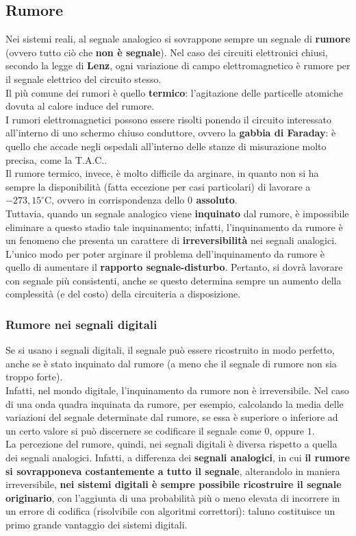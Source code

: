 \documentclass[a4paper]{extarticle}
\begin{document}
\subsection{Rumore}
Nei sistemi reali, al segnale analogico si sovrappone sempre un segnale di \textbf{rumore} (ovvero tutto ciò che \textbf{non è segnale}). Nel caso dei circuiti elettronici chiusi, secondo la legge di \textbf{Lenz}, ogni variazione di campo elettromagnetico è rumore per il segnale elettrico del circuito stesso.\\
Il più comune dei rumori è quello \textbf{termico}: l'agitazione delle particelle atomiche dovuta al calore induce del rumore.\\
I rumori elettromagnetici possono essere risolti ponendo il circuito interessato all'interno di uno schermo chiuso conduttore, ovvero la \textbf{gabbia di Faraday}: è quello che accade negli ospedali all'interno delle stanze di misurazione molto precisa, come la T.A.C..\\
Il rumore termico, invece, è molto difficile da arginare, in quanto non si ha sempre la disponibilità (fatta eccezione per casi particolari) di lavorare a \(-273,15 ^\circ\)C, ovvero in corrispondenza dello \textbf{\(0\) assoluto}.\\
Tuttavia, quando un segnale analogico viene \textbf{inquinato} dal rumore, è impossibile eliminare a questo stadio tale inquinamento; infatti, l'inquinamento da rumore è un fenomeno che presenta un carattere di \textbf{irreversibilità} nei segnali analogici.\\
L'unico modo per poter arginare il problema dell'inquinamento da rumore è quello di aumentare il \textbf{rapporto segnale-disturbo}. Pertanto, si dovrà lavorare con segnale più consistenti, anche se questo determina sempre un aumento della complessità (e del costo) della circuiteria a disposizione.

\subsubsection{Rumore nei segnali digitali}
Se si usano i segnali digitali, il segnale può essere ricostruito in modo perfetto, anche se è stato inquinato dal rumore (a meno che il segnale di rumore non sia troppo forte).\\
Infatti, nel mondo digitale, l'inquinamento da rumore non è irreversibile. Nel caso di una onda quadra inquinata da rumore, per esempio, calcolando la media delle variazioni del segnale determinate dal rumore, se essa è superiore o inferiore ad un certo valore si può discernere se codificare il segnale come \(0\), oppure \(1\).\\
La percezione del rumore, quindi, nei segnali digitali è diversa rispetto a quella dei segnali analogici. Infatti, a differenza dei \textbf{segnali analogici}, in cui \textbf{il rumore si sovrapponeva costantemente a tutto il segnale}, alterandolo in maniera irreversibile, \textbf{nei sistemi digitali è sempre possibile ricostruire il segnale originario}, con l'aggiunta di una probabilità più o meno elevata di incorrere in un errore di codifica (risolvibile con algoritmi correttori): taluno costituisce un primo grande vantaggio dei sistemi digitali.
\end{document}
